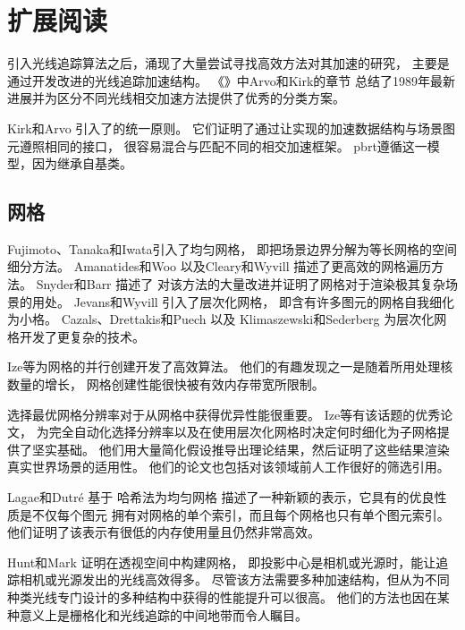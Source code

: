 \section{扩展阅读}\label{sec:扩展阅读04}
引入光线追踪算法之后，涌现了大量尝试寻找高效方法对其加速的研究，
主要是通过开发改进的光线追踪加速结构。
《》\citep{10.5555/94788}中Arvo和Kirk的章节
总结了1989年最新进展并为区分不同光线相交加速方法提供了优秀的分类方案。

Kirk和Arvo \parencite*{Kirk88theray}引入了的统一原则。
它们证明了通过让实现的加速数据结构与场景图元遵照相同的接口，
很容易混合与匹配不同的相交加速框架。
pbrt遵循这一模型，因为继承自基类。

\subsection{网格}\label{sub:网格}
Fujimoto、Tanaka和Iwata\parencite*{4056861}引入了均匀网格，
即把场景边界分解为等长网格的空间细分方法。
Amanatides和Woo \parencite*{10.2312:egtp.19871000}
以及Cleary和Wyvill \parencite*{Cleary1988}描述了更高效的网格遍历方法。
Snyder和Barr \parencite*{10.1145/37401.37417}描述了
对该方法的大量改进并证明了网格对于渲染极其复杂场景的用处。
Jevans和Wyvill \parencite*{Jevans1989:23}引入了层次化网格，
即含有许多图元的网格自我细化为小格。
Cazals、Drettakis和Puech \parencite*{cazals1995filtering}以及
Klimaszewski和Sederberg \parencite*{576857}为层次化网格开发了更复杂的技术。

Ize等\parencite*{4061545}为网格的并行创建开发了高效算法。
他们的有趣发现之一是随着所用处理核数量的增长，
网格创建性能很快被有效内存带宽所限制。

选择最优网格分辨率对于从网格中获得优异性能很重要。
Ize等\parencite*{4342587}有该话题的优秀论文，
为完全自动化选择分辨率以及在使用层次化网格时决定何时细化为子网格提供了坚实基础。
他们用大量简化假设推导出理论结果，然后证明了这些结果渲染真实世界场景的适用性。
他们的论文也包括对该领域前人工作很好的筛选引用。

Lagae和Dutré \parencite*{lagae2008compact}基于
哈希法为均匀网格
描述了一种新颖的表示，它具有的优良性质是不仅每个图元
拥有对网格的单个索引，而且每个网格也只有单个图元索引。
他们证明了该表示有很低的内存使用量且仍然非常高效。

Hunt和Mark \parencite*{4634613}证明在透视空间中构建网格，
即投影中心是相机或光源时，能让追踪相机或光源发出的光线高效得多。
尽管该方法需要多种加速结构，但从为不同种类光线专门设计的多种结构中获得的性能提升可以很高。
他们的方法也因在某种意义上是栅格化和光线追踪的中间地带而令人瞩目。

